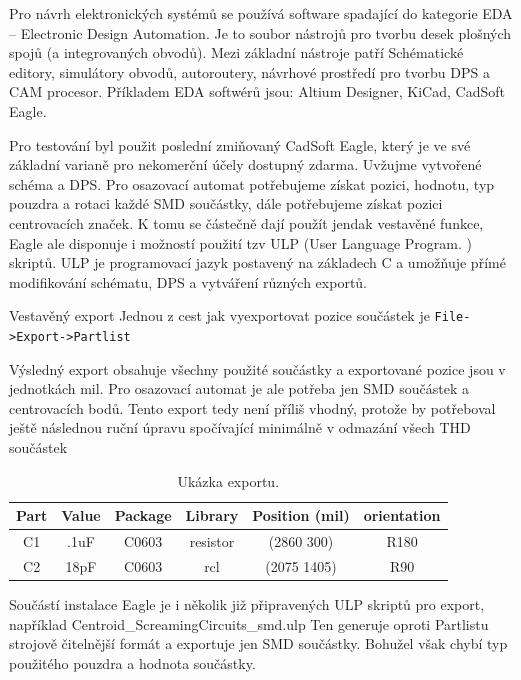 Pro návrh elektronických systémů se používá software spadající do kategorie EDA – Electronic Design Automation. Je to soubor nástrojů pro tvorbu desek plošných spojů (a integrovaných obvodů). Mezi základní nástroje patří Schématické editory, simulátory obvodů, autoroutery, návrhové prostředí pro tvorbu DPS a CAM procesor. 
Příkladem EDA softwérů jsou: Altium Designer, KiCad, CadSoft Eagle.

Pro testování byl použit poslední zmiňovaný CadSoft Eagle, který je ve své základní varianě pro nekomerční účely dostupný zdarma. Uvžujme vytvořené schéma a DPS. Pro osazovací automat potřebujeme získat pozici, hodnotu, typ pouzdra a rotaci každé SMD součástky, dále potřebujeme získat pozici centrovacích značek. K tomu se částečně dají použít jendak vestavěné funkce, Eagle ale disponuje i možností použití tzv ULP (User Language Program. ) skriptů. ULP je programovací jazyk postavený na základech C a umožňuje přímé modifikování schématu, DPS a vytváření různých exportů.


Vestavěný export
Jednou z cest jak vyexportovat pozice součástek je \verb|File->Export->Partlist|


Výsledný export obsahuje všechny použité součástky a exportované pozice jsou v jednotkách mil. Pro osazovací automat je ale potřeba jen SMD součástek a centrovacích bodů. Tento export tedy není příliš vhodný, protože by potřeboval ještě následnou ruční úpravu spočívající minimálně v odmazání všech THD součástek


\begin{table}[h!]
  \caption{Ukázka exportu. }
  \begin{center}
  	\small
	  \begin{tabular}{|c|c|c|c|c|c|}
	    \hline
	    Part	& Value 	& Package 	& Library 	& Position (mil) 	& orientation	\\
	    \hline\hline

		C1 	& .1uF		& C0603		& resistor	& (2860 300)		& R180		\\
		\hline
		C2 	& 18pF		& C0603		& rcl		& (2075 1405)		& R90		\\
		\hline
	    \hline
	  \end{tabular}
  \end{center}
\end{table}

Součástí instalace Eagle je i několik již připravených ULP skriptů pro export, například Centroid\_ScreamingCircuits\_smd.ulp
Ten generuje oproti Partlistu strojově čitelnější formát a exportuje jen SMD součástky. Bohužel však chybí typ použitého pouzdra a hodnota součástky. 

